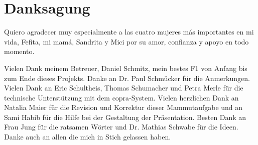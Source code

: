 \chapter*{Danksagung}

Quiero agradecer muy especialmente a las cuatro mujeres m\'as importantes en mi vida, Fefita, mi mam\'a, Sandrita y Mici por su amor, confianza y apoyo en todo momento.

Vielen Dank meinem Betreuer, Daniel Schmitz, mein bestes F1 von Anfang bis zum Ende dieses Projekts. Danke an Dr. Paul Schmücker für die Anmerkungen. Vielen Dank an Eric Schultheis, Thomas Schumacher und Petra Merle für die technische Unterstützung mit dem \acs{copra}-System. Vielen herzlichen Dank an Natalia Maier für die Revision und Korrektur dieser Mammutaufgabe und an Sami Habib für die Hilfe bei der Gestaltung der Präsentation. Besten Dank an Frau Jung für die ratsamen Wörter und Dr. Mathias Schwabe für die Ideen. Danke auch an allen die mich in Stich gelassen haben.
